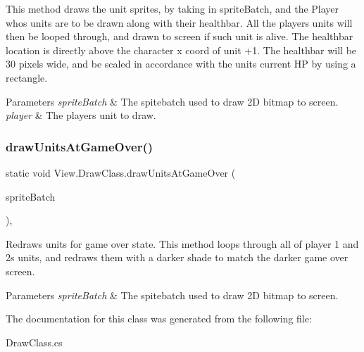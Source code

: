 This method draws the unit sprites, by taking in sprite\+Batch, and the Player who\textquotesingle{}s units are to be drawn along with their healthbar. All the player\textquotesingle{}s units will then be looped through, and drawn to screen if such unit is alive. The healthbar location is directly above the character x coord of unit +1. The healthbar will be 30 pixels wide, and be scaled in accordance with the unit\textquotesingle{}s current HP by using a rectangle. 
\begin{DoxyParams}{Parameters}
{\em sprite\+Batch} & The spitebatch used to draw 2D bitmap to screen. \\
\hline
{\em player} & The player\textquotesingle{}s unit to draw. \\
\hline
\end{DoxyParams}
\hypertarget{class_view_1_1_draw_class_a69c3edf89c9b736bb8a9921e2e489e1a}{}\label{class_view_1_1_draw_class_a69c3edf89c9b736bb8a9921e2e489e1a} 
\subsubsection{\texorpdfstring{draw\+Units\+At\+Game\+Over()}{drawUnitsAtGameOver()}}
{\footnotesize\ttfamily static void View.\+Draw\+Class.\+draw\+Units\+At\+Game\+Over (\begin{DoxyParamCaption}\item[{Sprite\+Batch}]{sprite\+Batch }\end{DoxyParamCaption})\hspace{0.3cm}{\ttfamily [inline]}, {\ttfamily [static]}}

Redraws units for game over state. This method loops through all of player 1 and 2\textquotesingle{}s units, and redraws them with a darker shade to match the darker game over screen. 
\begin{DoxyParams}{Parameters}
{\em sprite\+Batch} & The spitebatch used to draw 2D bitmap to screen. \\
\hline
\end{DoxyParams}


The documentation for this class was generated from the following file\+:\begin{DoxyCompactItemize}
\item 
Draw\+Class.\+cs\end{DoxyCompactItemize}
